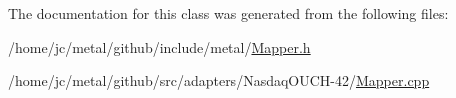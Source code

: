 The documentation for this class was generated from the following files\+:\begin{DoxyCompactItemize}
\item 
/home/jc/metal/github/include/metal/\hyperlink{include_2metal_2Mapper_8h}{Mapper.\+h}\item 
/home/jc/metal/github/src/adapters/\+Nasdaq\+O\+U\+C\+H-\/42/\hyperlink{adapters_2NasdaqOUCH-42_2Mapper_8cpp}{Mapper.\+cpp}\end{DoxyCompactItemize}

